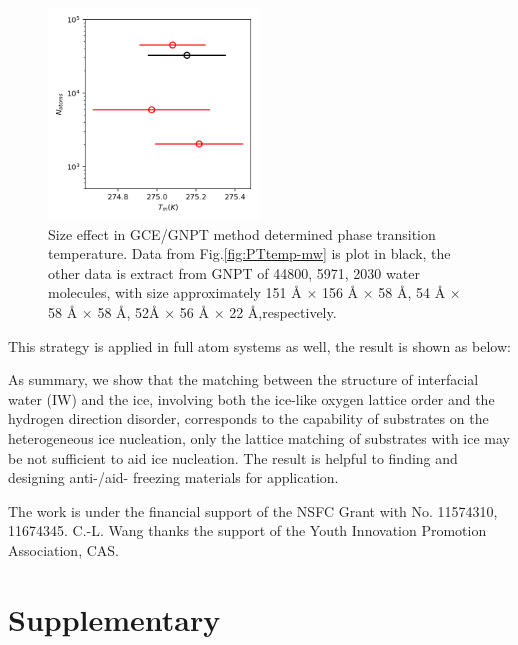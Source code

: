 \documentclass[aps,prl,twocolumn,superscriptaddress]{revtex4-1}
\begin{document}
\begin{figure}[ht]
\centering{}\includegraphics[width=0.5\textwidth]{size_effect.png} 
\caption{Size effect in GCE/GNPT method determined phase transition temperature. Data from Fig.\ref{fig:PTtemp-mw} is plot in black, the other data is extract from GNPT of 44800, 5971, 2030 water molecules, with size approximately 151 Å × 156 Å × 58 Å, 54 Å × 58 Å × 58 Å, 52Å × 56 Å × 22 Å,respectively.
\label{fig:sizeeffect}} 
\end{figure}
 This strategy is applied in full atom systems as well, the result is shown as below:
 
 

As summary, we show that the matching between the structure of interfacial water (IW) and the ice, involving both the ice-like oxygen lattice order and the hydrogen direction disorder, corresponds to the capability of substrates on the heterogeneous ice nucleation, only the lattice matching of substrates with ice may be not sufficient to aid ice nucleation. The result is helpful to finding and designing anti-/aid- freezing materials for application. 
    
The work is under the financial support of the NSFC Grant with No. 11574310, 11674345. C.-L. Wang thanks the support of the Youth Innovation Promotion Association, CAS. 

\section{Supplementary}
\end{document}
